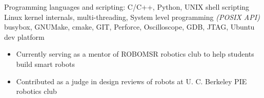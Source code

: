 \documentclass[10pt,a4paper]{article} %
\begin{document}

\inlineheadsection %
{Programming languages and scripting:} {C/C++, Python, UNIX shell scripting}
 {Linux kernel internals, multi-threading, System level programming \textit{(POSIX API)}}
 {busybox, GNUMake, cmake, GIT, Perforce, Oscilloscope, GDB, JTAG, Ubuntu dev platform}
{}

%

\spacedhrule{1.6em}{-0.4em} %


{
  \begin {itemize} 
	\item Currently serving as a mentor of ROBOMSR robotics club to help students build smart robots
	\item Contributed as a judge in design reviews of robots at U. C. Berkeley PIE robotics club
	\end{itemize}
}
%
\end{document}
